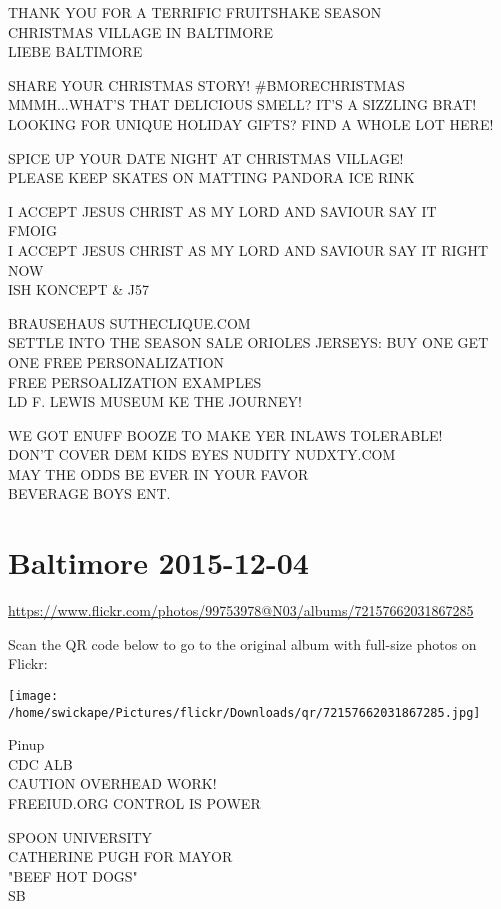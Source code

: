 \documentclass[10pt,letterpaper]{article}
\begin{document}
THANK YOU FOR A TERRIFIC FRUITSHAKE SEASON\\
CHRISTMAS VILLAGE IN BALTIMORE\\
LIEBE BALTIMORE

SHARE YOUR CHRISTMAS STORY!  \#BMORECHRISTMAS\\
MMMH...WHAT'S THAT DELICIOUS SMELL?  IT'S A SIZZLING BRAT!\\
LOOKING FOR UNIQUE HOLIDAY GIFTS?  FIND A WHOLE LOT HERE!

SPICE UP YOUR DATE NIGHT AT CHRISTMAS VILLAGE!\\
PLEASE KEEP SKATES ON MATTING PANDORA ICE RINK

I ACCEPT JESUS CHRIST AS MY LORD AND SAVIOUR SAY IT\\
FMOIG\\
I ACCEPT JESUS CHRIST AS MY LORD AND SAVIOUR SAY IT RIGHT NOW\\
ISH KONCEPT \& J57

BRAUSEHAUS SUTHECLIQUE.COM\\
SETTLE INTO THE SEASON SALE ORIOLES JERSEYS: BUY ONE GET ONE FREE PERSONALIZATION\\
FREE PERSOALIZATION EXAMPLES\\
LD F. LEWIS MUSEUM KE THE JOURNEY!

WE GOT ENUFF BOOZE TO MAKE YER INLAWS TOLERABLE!\\
DON'T COVER DEM KIDS EYES NUDITY NUDXTY.COM\\
MAY THE ODDS BE EVER IN YOUR FAVOR\\
BEVERAGE BOYS ENT.
\pagebreak

\section*{Baltimore 2015-12-04}

\url{https://www.flickr.com/photos/99753978@N03/albums/72157662031867285}

Scan the QR code below to go to the original album with full-size photos on Flickr:

\texttt{[image: /home/swickape/Pictures/flickr/Downloads/qr/72157662031867285.jpg]}
\pagebreak

Pinup\\
CDC ALB\\
CAUTION OVERHEAD WORK!\\
FREEIUD.ORG CONTROL IS POWER

SPOON UNIVERSITY\\
CATHERINE PUGH FOR MAYOR\\
"BEEF HOT DOGS"\\
SB
\end{document}
